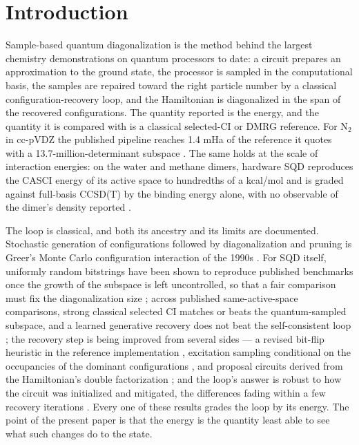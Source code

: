 \documentclass[11pt]{article}
\begin{document}
\section{Introduction}\label{sec:1}


Sample-based quantum diagonalization \cite{SQD} is the method behind the largest chemistry demonstrations on quantum processors to date: a circuit prepares an approximation to the ground state, the processor is sampled in the computational basis, the samples are repaired toward the right particle number by a classical configuration-recovery loop, and the Hamiltonian is diagonalized in the span of the recovered configurations. The quantity reported is the energy, and the quantity it is compared with is a classical selected-CI or DMRG reference. For N$_2$ in cc-pVDZ the published pipeline reaches 1.4 mHa of the reference it quotes with a 13.7-million-determinant subspace \cite{SQDAlain}. The same holds at the scale of interaction energies: on the water and methane dimers, hardware SQD reproduces the CASCI energy of its active space to hundredths of a kcal/mol and is graded against full-basis CCSD(T) by the binding energy alone, with no observable of the dimer's density reported \cite{Kaliakin2025}.

The loop is classical, and both its ancestry and its limits are documented. Stochastic generation of configurations followed by diagonalization and pruning is Greer's Monte Carlo configuration interaction of the 1990s \cite{Greer1995,Greer1998}. For SQD itself, uniformly random bitstrings have been shown to reproduce published benchmarks once the growth of the subspace is left uncontrolled, so that a fair comparison must fix the diagonalization size \cite{vanRossum2026}; across published same-active-space comparisons, strong classical selected CI matches or beats the quantum-sampled subspace, and a learned generative recovery does not beat the self-consistent loop \cite{Bonilla2026a,Bonilla2026b}; the recovery step is being improved from several sides --- a revised bit-flip heuristic in the reference implementation \cite{SQDaddon}, excitation sampling conditional on the occupancies of the dominant configurations \cite{Weaving2025}, and proposal circuits derived from the Hamiltonian's double factorization \cite{AgarwalRay2026}; and the loop's answer is robust to how the circuit was initialized and mitigated, the differences fading within a few recovery iterations \cite{Bhuiyan2026}. Every one of these results grades the loop by its energy. The point of the present paper is that the energy is the quantity least able to see what such changes do to the state.
\end{document}
